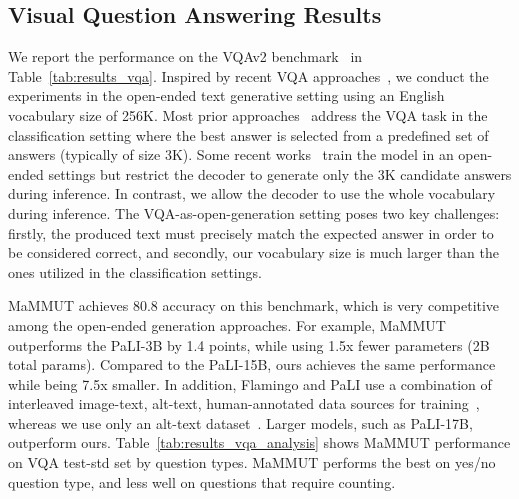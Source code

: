 \documentclass[10pt]{article} \usepackage[accepted]{tmlr}
\newcommand{\ours}{MaMMUT\xspace}
\begin{document}
\vspace{-0.3cm}
\subsection{Visual Question Answering Results}
\vspace{-0.2cm}
\label{sec:vqa}

We report the performance on the VQAv2 benchmark~\citep{agrawal2015vqa} in Table~\ref{tab:results_vqa}.
Inspired by recent VQA approaches~\citep{pali,flamingo,piergiovanni2022answer}, we conduct the experiments in the open-ended text generative setting using an English vocabulary size of 256K. Most prior approaches~\citep{wang2021simvlm,yu2022coca,wang2022image,wang2022unifying} address the VQA task in the classification setting where the best answer is selected from a predefined set of answers (typically of size 3K). Some recent works~\citep{albef,li2022blip} train the model in an open-ended settings but restrict the decoder to generate only the 3K candidate answers during inference. In contrast, we allow the decoder to use the whole vocabulary during inference. The VQA-as-open-generation setting poses two key challenges: firstly, the produced text must precisely match the expected answer in order to be considered correct, and secondly, our vocabulary size is much larger than the ones utilized in the classification settings.

\ours achieves 80.8 accuracy on this benchmark, which is very competitive among the open-ended generation approaches. For example, \ours outperforms the PaLI-3B by 1.4 points, while using 1.5x fewer parameters (2B total params). Compared to the PaLI-15B, ours achieves the same performance while being 7.5x smaller. In addition, Flamingo and PaLI use a combination of interleaved image-text, alt-text, human-annotated data sources for training~\citep{flamingo,pali}, whereas we use only an alt-text dataset~\citep{align}. Larger models, such as PaLI-17B, outperform ours. 
Table~\ref{tab:results_vqa_analysis} shows \ours performance on VQA test-std set by question types. \ours performs the best on yes/no question type, and less well on questions that require counting.
\end{document}
